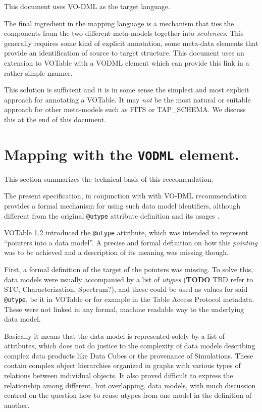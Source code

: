 \documentclass[11pt,a4paper]{ivoa}
\begin{document}
This document uses VO-DML as the target language.

The final ingredient in the mapping language is a mechanism that ties
the components from the two different meta-models together into
\emph{sentences}. This generally requires some kind of explicit
annotation, some meta-data elements that provide an identification of
source to target structure. This document uses an extension to VOTable
with a VODML element which can provide this link in a rather simple
manner.

This solution is sufficient and it is in some sense the simplest and
most explicit approach for annotating a VOTable. It may \emph{not} be
the most natural or suitable approach for other meta-models such as FITS
or TAP\_SCHEMA. We discuss this at the end of this document.

\section{Mapping with the \texttt{VODML}
element.}\label{mapping-with-the-vodml-element.}

This section summarizes the technical basis of this reccomendation.

The present specification, in conjunction with with VO-DML
recommendation \cite{2018ivoa.spec.0910L} provides a formal mechanism for using such
data model identifiers, although different from the original
\texttt{@utype} attribute definition and its usages \cite{note:utypeusage}.

VOTable 1.2 introduced the \texttt{@utype} attribute, which was intended
to represent ``pointers into a data model''. A precise and formal
definition on how this \emph{pointing} was to be achieved and a
description of its meaning was missing though.

First, a formal definition of the target of the pointers was missing. To
solve this, data models were usually accompanied by a list of
\emph{utypes} (\textbf{TODO} TBD refer to STC, Characterization,
Spectrum?), and these could be used as values for said
\texttt{@utype}, be it in VOTable or for example in the Table Access
Protocol metadata. These were not linked in any formal, machine readable
way to the underlying data model.

Basically it means that the data model is represented solely by a list
of attributes, which does not do justice to the complexity of data
models describing complex data products like Data Cubes or the
provenance of Simulations. These contain complex object hierarchies
organized in graphs with various types of relations between individual
objects. It also proved difficult to express the relationship among
different, but overlapping, data models, with much discussion centred on
the question how to reuse utypes from one model in the definition of
another.
\end{document}
